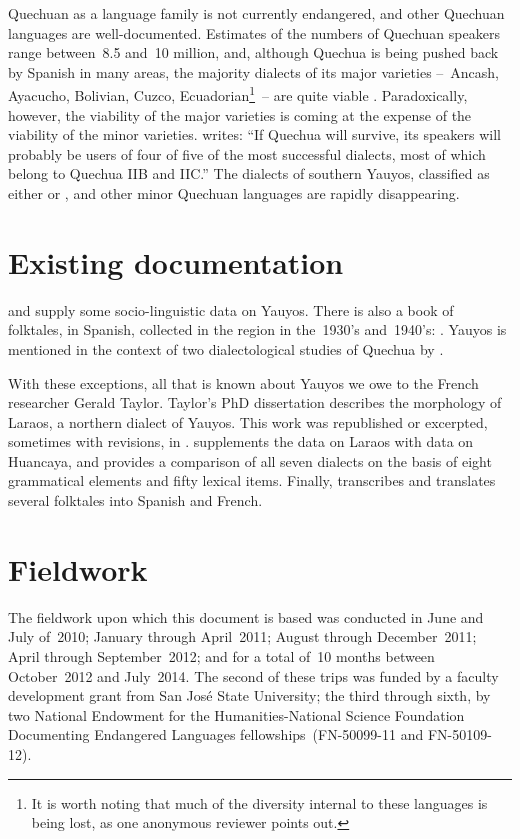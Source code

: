 Quechuan as a language family is not currently endangered, and other Quechuan languages are well-documented. Estimates of the numbers of Quechuan speakers range between~8.5 and~10 million, and, although Quechua is being pushed back by Spanish in many areas, the majority dialects of its major varieties --~Ancash, Ayacucho, Bolivian, Cuzco, Ecuadorian\footnote{It is worth noting that much of the diversity internal to these languages is being lost, as one anonymous reviewer points out.}~-- are quite viable \citep[168]{Adelaar04}. Paradoxically, however, the viability of the major varieties is coming at the expense of the viability of the minor varieties. \citet[14]{Adelaar08} writes: “If Quechua will survive, its speakers will probably be users of four of five of the most successful dialects, most of which belong to Quechua IIB and IIC.” The dialects of southern Yauyos, classified as either \QI{} or \QIIA, and other minor Quechuan languages are rapidly disappearing.

\section{Existing documentation}\label{sec:documentation}
\citet{Echerd74} and \citet{Brougere92} supply some socio-linguistic data on Yauyos. There is also a book of folktales, in Spanish, collected in the region in the~1930’s and~1940’s:  \citep{Varilla}. Yauyos is mentioned in the context of two dialectological studies of Quechua by \citet{Torero68,Torero74}.

With these exceptions, all that is known about Yauyos we owe to the French researcher Gerald Taylor. Taylor’s PhD dissertation describes the morphology of Laraos, a northern dialect of Yauyos. This work was republished or excerpted, sometimes with revisions, in \citet{Taylor84,Taylor90,Taylor94a,Taylor94b}. \citet{Taylor87a} supplements the data on Laraos with data on Huancaya, and
\citet{Taylor90,Taylor00} provides a comparison of all seven dialects on the basis of eight grammatical elements and fifty lexical items. Finally, \citet{Taylor87b,Taylor87c,Taylor91} transcribes and translates several folktales into Spanish and French.

\section{Fieldwork} \label{sec:fieldwork}
The fieldwork upon which this document is based was conducted in June and July of~2010; January through April~2011; August through December~2011; April through September~2012; and for a total of~10 months between October~2012 and July~2014. The second of these trips was funded by a faculty development grant from San José State University; the third through sixth, by two National Endowment for the Humanities-National Science Foundation Documenting Endangered Languages fellowships~(FN-50099-11 and FN-50109-12).

